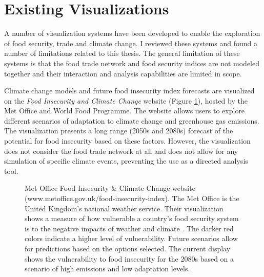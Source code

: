 \section{Existing Visualizations}
A number of visualization systems have been developed to enable the exploration of food security, trade and climate change. I reviewed these systems and found a number of limitations related to this thesis. The general limitation of these systems is that the food trade network and food security indices are not modeled together and their interaction and analysis capabilities are limited in scope.\par
Climate change models and future food insecurity index forecasts are visualized on the \textit{Food Insecurity and Climate Change} website (Figure \ref{metOffice}), hosted by the Met Office and World Food Programme. The website allows users to explore different scenarios of adaptation to climate change and greenhouse gas emissions. The visualization presents a long range (2050s and 2080s) forecast of the potential for food insecurity based on these factors. However, the visualization does not consider the food trade network at all and does not allow for any simulation of specific climate events, preventing the use as a directed analysis tool.\par
\begin{figure}[htb]
	\caption[MET OFFICE FOOD INSECURITY \& CLIMATE CHANGE WEBSITE]{Met Office Food Insecurity \& Climate Change website (www.metoffice.gov.uk/food-insecurity-index). The Met Office is the United Kingdom's national weather service. Their visualization shows a measure of how vulnerable a country's food security system is to the negative impacts of weather and climate \citep{metofficeCitation}. The darker red colors indicate a higher level of vulnerability. Future scenarios allow for predictions based on the options selected. The current display shows the vulnerability to food insecurity for the 2080s based on a scenario of high emissions and low adaptation levels.}
	\label{metOffice}
\end{figure}
